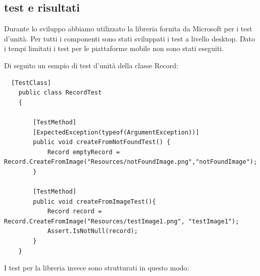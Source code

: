 \documentclass[twoside]{supsistudent}
\begin{document}
\subsection{test e risultati}%
Durante lo sviluppo abbiamo utilizzato la libreria fornita da Microsoft per i test d'unità. Per tutti i componenti sono stati sviluppati i test a livello desktop. Dato i tempi limitati i test per le piattaforme mobile non sono stati eseguiti. 

Di seguito un esmpio di test d'unità della classe Record:

\begin{lstlisting}
  [TestClass]
    public class RecordTest
    {

        [TestMethod]
        [ExpectedException(typeof(ArgumentException))]
        public void createFromNotFoundTest() {
            Record emptyRecord = Record.CreateFromImage("Resources/notFoundImage.png","notFoundImage"); 
        }

        [TestMethod]
        public void createFromImageTest(){
            Record record = Record.CreateFromImage("Resources/testImage1.png", "testImage1");
            Assert.IsNotNull(record);
        }
    }
\end{lstlisting}

I test per la libreria invece sono strutturati in questo modo:
\end{document}
